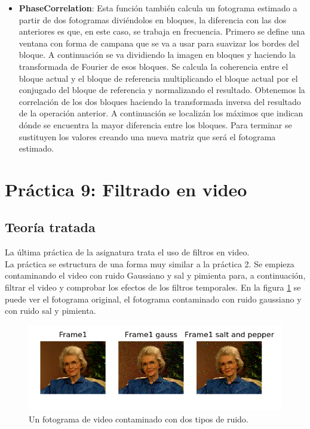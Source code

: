 \documentclass[a4paper,12pt]{report}
\begin{document}
\begin{itemize}
	\item \textbf{PhaseCorrelation}: Esta función también calcula un fotograma estimado a partir de dos fotogramas diviéndolos en bloques, la diferencia con las dos anteriores es que, en este caso, se trabaja en frecuencia. Primero se define una ventana con forma de campana que se va a usar para suavizar los bordes del bloque. A continuación se va dividiendo la imagen en bloques y haciendo la transformada de Fourier de esos bloques.  Se calcula la coherencia entre el bloque actual y el bloque de referencia multiplicando el bloque actual por el conjugado del bloque de referencia y normalizando el resultado. Obtenemos la correlación de los dos bloques haciendo la transformada inversa del resultado de la operación anterior. A continuación se localizán los máximos que indican dónde se encuentra la mayor diferencia entre los bloques. Para terminar se sustituyen los valores creando una nueva matriz que será el fotograma estimado.
\end{itemize}

\section{ Práctica 9: Filtrado en video}
\subsection{Teoría tratada}

La última práctica de la asignatura trata el uso de filtros en video.\\

La práctica se estructura de una forma muy similar a la práctica 2. Se empieza contaminando el video con ruido Gaussiano y sal y pimienta para, a continuación, filtrar el video y comprobar los efectos de los filtros temporales. En la figura \ref{ruidovideo} se puede ver el fotograma original, el fotograma contaminado con ruido gaussiano y con ruido sal y pimienta.\\
\begin{figure}[h]
\centering
\includegraphics[width=1.0\textwidth]{imagenes/ruidovideo}
\caption{Un fotograma de video contaminado con dos tipos de ruido.}
\label{ruidovideo} 
\end{figure}
\end{document}
